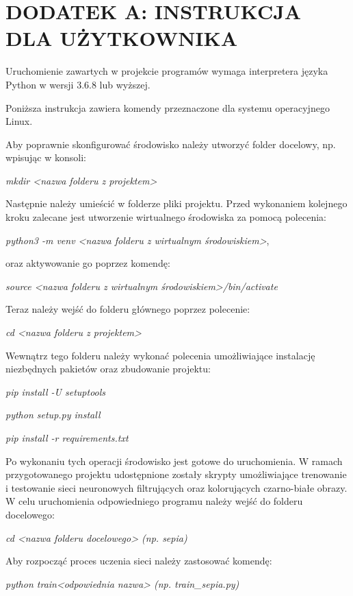 \section*{DODATEK A: INSTRUKCJA DLA UŻYTKOWNIKA}

  Uruchomienie zawartych w projekcie programów wymaga interpretera
  języka Python w wersji 3.6.8 lub wyższej.

  \noindent
  Poniższa instrukcja zawiera komendy przeznaczone dla systemu operacyjnego
  Linux.

  \noindent
  Aby poprawnie skonfigurować środowisko należy utworzyć folder docelowy, np.
  wpisując w konsoli:

  \textit{mkdir <nazwa folderu z projektem>}

  \noindent
  Następnie należy umieścić w folderze pliki projektu. Przed wykonaniem
  kolejnego kroku zalecane jest utworzenie wirtualnego środowiska za pomocą
  polecenia:

  \textit{python3 -m venv <nazwa folderu z wirtualnym środowiskiem>},

  \noindent
  oraz aktywowanie go poprzez komendę:

  \textit{source <nazwa folderu z wirtualnym środowiskiem>/bin/activate}

  \noindent
  Teraz należy wejść do folderu głównego poprzez polecenie:

  \textit{cd <nazwa folderu z projektem>}

  \noindent
  Wewnątrz tego folderu należy wykonać polecenia umożliwiające instalację niezbędnych
  pakietów oraz zbudowanie projektu:

  \textit{pip install -U setuptools}

  \textit{python setup.py install}

  \textit{pip install -r requirements.txt}

  \noindent
  Po wykonaniu tych operacji środowisko jest gotowe do uruchomienia. W ramach
  przygotowanego projektu udostępnione zostały skrypty umożliwiające trenowanie
  i testowanie sieci neuronowych filtrujących oraz kolorujących czarno-białe
  obrazy. W celu uruchomienia odpowiedniego programu należy wejść do folderu
  docelowego:

  \textit{cd <nazwa folderu docelowego> (np. sepia)}

  \noindent
  Aby rozpocząć proces uczenia sieci należy zastosować komendę:

  \textit{python train<odpowiednia nazwa> (np. train\_sepia.py)}

